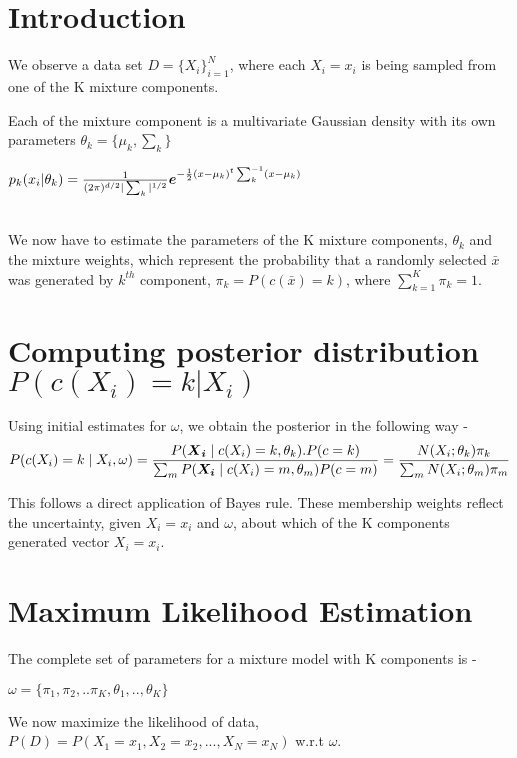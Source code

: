 \documentclass[12pt]{article}
\begin{document}
	\MakeScribeTop


\section{Introduction}

We observe a data set $D = \{X_i\}_{i=1}^{N}$, where each $X_i = x_i$ is being sampled from one of the K mixture components.

Each of the mixture component is a multivariate Gaussian density with its own parameters $\theta_k = \{\mu_k, \sum_k\}$ 
\begin{center}
$p_k(x_i|\theta_k) = \frac{1}{(2\pi)^{d/2}|\sum_k|^{1/2}} {\boldsymbol e}^{-\frac{1}{2}(x-\mu_k)^t\sum_k^{-1}(x-\mu_k)}$
\end{center} 
\\

We now have to estimate the parameters of the K mixture components, $\theta_k$ and the mixture weights, which represent the probability that a randomly selected $\bar{x}$ was generated by $k^{th}$ component, $\pi_k = P(c(\bar{x}) = k)$, where $\sum_{k=1}^K \pi_k = 1$.

\section{Computing posterior distribution $P(c(X_i)=k | X_i)$}

Using initial estimates for $\omega$, we obtain the posterior in the following way -
\begin{gather*}
\begin{aligned}
    & P(c(X_i)=k \mid X_{i}, \omega) = \dfrac {P(\bm{{\boldsymbol X}_i} \mid c(X_i)=k, \theta_k). P(c = k)} {\sum_{m}P(\bm{X_i} \mid c(X_i) = m, \theta_m)P(c = m)} = \dfrac {N(X_i; \theta_k) \pi_k} {\sum_{m}N(X_i; \theta_m) \pi_m}\\
\end{aligned}
\end{gather*}

This follows a direct application of Bayes rule. These membership weights reflect the uncertainty, given $X_i = x_i$ and $\omega$, about which of the K components generated vector $X_i = x_i$.

\section{Maximum Likelihood Estimation}
The complete set of parameters for a mixture model with K components is - 
\begin{center}
    $\omega = \{ \pi_1, \pi_2, .. \pi_K, \theta_1, .., \theta_K \}$
\end{center}
We now maximize the likelihood of data, $P(D) = P(X_1 = x_1, X_2 = x_2, ..., X_N = x_N)$ w.r.t $\omega$.
\end{document}
